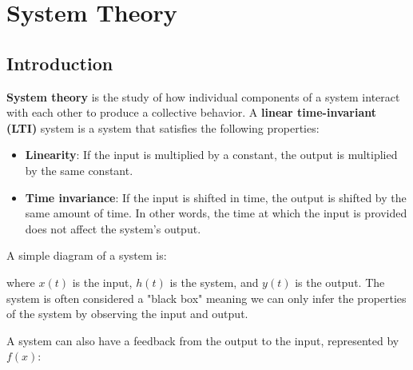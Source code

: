 \section{System Theory}

\subsection{Introduction}

\textbf{System theory} is the study of how individual components of a system interact with each other to produce a collective behavior. A \textbf{linear time-invariant (LTI)} system is a system that satisfies the following properties:
\begin{itemize}
    \item \textbf{Linearity}: If the input is multiplied by a constant, the output is multiplied by the same constant.
    \item \textbf{Time invariance}: If the input is shifted in time, the output is shifted by the same amount of time. In other words, the time at which the input is provided does not affect the system's output.
\end{itemize}

A simple diagram of a system is:
\begin{center}
\end{center}

where $x(t)$ is the input, $h(t)$ is the system, and $y(t)$ is the output. The system is often considered a "black box" meaning we can only infer the properties of the system by observing the input and output.

\vsp
A system can also have a feedback from the output to the input, represented by $f(x)$:

